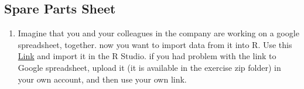 \documentclass[
  doc,
  longtable,
  a4paper,
  nolmodern,
  notxfonts,
  notimes,
  colorlinks=true,linkcolor=blue,citecolor=blue,urlcolor=blue]{apa7}
\providecommand{\tightlist}{%
  \setlength{\itemsep}{0pt}\setlength{\parskip}{0pt}}
\begin{document}
\subsection{Spare Parts Sheet}\label{spare-parts-sheet}

\begin{enumerate}
\def\labelenumi{\arabic{enumi}.}
\setcounter{enumi}{2}
\tightlist
\item
  Imagine that you and your colleagues in the company are working on a
  google spreadsheet, together. now you want to import data from it into
  R. Use this
  \href{https://docs.google.com/spreadsheets/d/1BoD9bXwbxm1NJWhEnk6BVXUxuxWbWArQWVT3LIKk2PQ/edit?usp=sharing}{Link}
  and import it in the R Studio. if you had problem with the link to
  Google spreadsheet, upload it (it is available in the exercise zip
  folder) in your own account, and then use your own link.
\end{enumerate}
\end{document}
